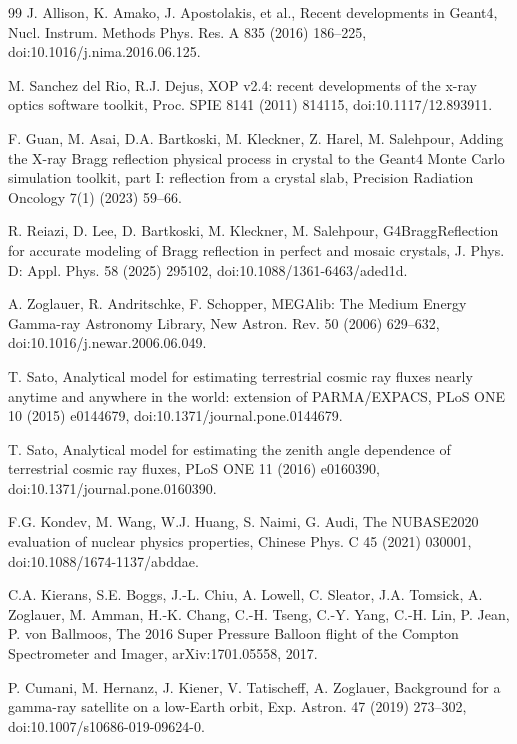 \documentclass[11pt]{article}
\begin{document}
\begin{thebibliography}{99}
J. Allison, K. Amako, J. Apostolakis, et al., Recent developments in Geant4, Nucl. Instrum. Methods Phys. Res. A 835 (2016) 186--225, doi:10.1016/j.nima.2016.06.125.

M. Sanchez del Rio, R.J. Dejus, XOP v2.4: recent developments of the x-ray optics software toolkit, Proc. SPIE 8141 (2011) 814115, doi:10.1117/12.893911.

F. Guan, M. Asai, D.A. Bartkoski, M. Kleckner, Z. Harel, M. Salehpour, Adding the X-ray Bragg reflection physical process in crystal to the Geant4 Monte Carlo simulation toolkit, part I: reflection from a crystal slab, Precision Radiation Oncology 7(1) (2023) 59--66.

R. Reiazi, D. Lee, D. Bartkoski, M. Kleckner, M. Salehpour, G4BraggReflection for accurate modeling of Bragg reflection in perfect and mosaic crystals, J. Phys. D: Appl. Phys. 58 (2025) 295102, doi:10.1088/1361-6463/aded1d.

A. Zoglauer, R. Andritschke, F. Schopper, MEGAlib: The Medium Energy Gamma-ray Astronomy Library, New Astron. Rev. 50 (2006) 629--632, doi:10.1016/j.newar.2006.06.049.

T. Sato, Analytical model for estimating terrestrial cosmic ray fluxes nearly anytime and anywhere in the world: extension of PARMA/EXPACS, PLoS ONE 10 (2015) e0144679, doi:10.1371/journal.pone.0144679.

T. Sato, Analytical model for estimating the zenith angle dependence of terrestrial cosmic ray fluxes, PLoS ONE 11 (2016) e0160390, doi:10.1371/journal.pone.0160390.

F.G. Kondev, M. Wang, W.J. Huang, S. Naimi, G. Audi, The NUBASE2020 evaluation of nuclear physics properties, Chinese Phys. C 45 (2021) 030001, doi:10.1088/1674-1137/abddae.

C.A. Kierans, S.E. Boggs, J.-L. Chiu, A. Lowell, C. Sleator, J.A. Tomsick, A. Zoglauer, M. Amman, H.-K. Chang, C.-H. Tseng, C.-Y. Yang, C.-H. Lin, P. Jean, P. von Ballmoos, The 2016 Super Pressure Balloon flight of the Compton Spectrometer and Imager, arXiv:1701.05558, 2017.

P. Cumani, M. Hernanz, J. Kiener, V. Tatischeff, A. Zoglauer,
Background for a gamma-ray satellite on a low-Earth orbit,
Exp. Astron. 47 (2019) 273--302,
doi:10.1007/s10686-019-09624-0.


\end{thebibliography}
\end{document}
